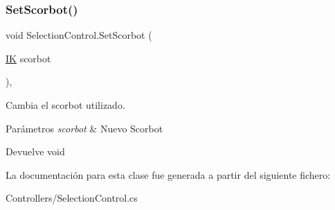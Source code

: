 \subsubsection{\texorpdfstring{SetScorbot()}{SetScorbot()}}
{\footnotesize\ttfamily void Selection\+Control.\+Set\+Scorbot (\begin{DoxyParamCaption}\item[{\mbox{\hyperlink{class_i_k}{IK}}}]{scorbot }\end{DoxyParamCaption})\hspace{0.3cm}{\ttfamily [inline]}, {\ttfamily [private]}}

Cambia el scorbot utilizado. 
\begin{DoxyParams}{Parámetros}
{\em scorbot} & Nuevo Scorbot \\
\hline
\end{DoxyParams}
\begin{DoxyReturn}{Devuelve}
void 
\end{DoxyReturn}


La documentación para esta clase fue generada a partir del siguiente fichero\+:\begin{DoxyCompactItemize}
\item 
Controllers/Selection\+Control.\+cs\end{DoxyCompactItemize}
